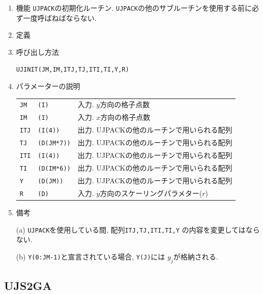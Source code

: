 \documentclass[a4j,fleqn]{jarticle}
\begin{document}
\begin{enumerate}

\item 機能 
{\tt UJPACK}の初期化ルーチン. 
{\tt UJPACK}の他のサブルーチンを使用する前に必ず一度呼ばねばならない.

\item 定義

\item 呼び出し方法 
    
{\tt UJINIT(JM,IM,ITJ,TJ,ITI,TI,Y,R)}
  
\item パラメーターの説明 
    
\begin{tabular}{lll}
{\tt JM} & {\tt (I)} & 入力. $y$方向の格子点数\\
{\tt IM} & {\tt (I)} & 入力. $x$方向の格子点数\\
{\tt ITJ}  & {\tt (I(4))}    & 出力. UJPACKの他のルーチンで用いられる配列\\
{\tt TJ}   & {\tt (D(JM*7))} & 出力. UJPACKの他のルーチンで用いられる配列\\
{\tt ITI}  & {\tt (I(4))}    & 出力. UJPACKの他のルーチンで用いられる配列\\
{\tt TI}   & {\tt (D(IM*6))} & 出力. UJPACKの他のルーチンで用いられる配列\\
{\tt Y}  & {\tt (D(JM))}     & 出力. UJPACKの他のルーチンで用いられる配列\\
{\tt R}  & {\tt (D)}     & 入力. $y$方向のスケーリングパラメター($r$)
\end{tabular}

\item 備考

(a) {\tt UJPACK}を使用している間, 配列{\tt ITJ,TJ,ITI,TI,Y}
の内容を変更してはならない.

(b) {\tt Y(0:JM-1)}と宣言されている場合, {\tt Y(J)}には
    $y_j$が格納される.

\end{enumerate}


\subsection{UJS2GA}
\end{document}
